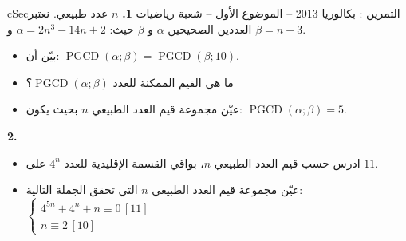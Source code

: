 \documentclass[12pt,a4paper]{article}
\newenvironment{BOX}[2]{\begin{otherlanguage}{english}\begin{arbox}{#1}{#2}}{\end{arbox}\end{otherlanguage}}
\newcounter{exo}
\newenvironment{tamrin}[1]{\stepcounter{exo}\begin{BOX}{cSec}{التمرين \theexo: #1}}{\end{BOX}}
\newcommand{\pgcd}{\operatorname{PGCD}}
\newenvironment{sq}{\begin{itemize}[leftmargin=2.4em,itemsep=3pt]}{\end{itemize}}
\newcommand{\qa}{\item[(أ)]}\newcommand{\qb}{\item[(ب)]}\newcommand{\qc}{\item[(جـ)]}\newcommand{\qd}{\item[(د)]}\newcommand{\qe}{\item[(هـ)]}
\begin{document}
\begin{tamrin}{بكالوريا 2013 -- الموضوع الأول -- شعبة رياضيات}
\textbf{1.} $n$ عدد طبيعي. نعتبر العددين الصحيحين $\alpha$ و $\beta$ حيث: $\alpha=2n^3-14n+2$ و $\beta=n+3$.
\begin{sq}
\qa بيّن أن: $\pgcd(\alpha;\beta)=\pgcd(\beta;10)$.
\qb ما هي القيم الممكنة للعدد $\pgcd(\alpha;\beta)$؟
\qc عيّن مجموعة قيم العدد الطبيعي $n$ بحيث يكون: $\pgcd(\alpha;\beta)=5$.
\end{sq}
\textbf{2.}
\begin{sq}
\qa ادرس حسب قيم العدد الطبيعي $n$، بواقي القسمة الإقليدية للعدد $4^n$ على $11$.
\qb عيّن مجموعة قيم العدد الطبيعي $n$ التي تحقق الجملة التالية: $\begin{cases}4^{5n}+4^n+n\equiv0\,[11]\\ n\equiv2\,[10]\end{cases}$
\end{sq}
\end{tamrin}
\end{document}
